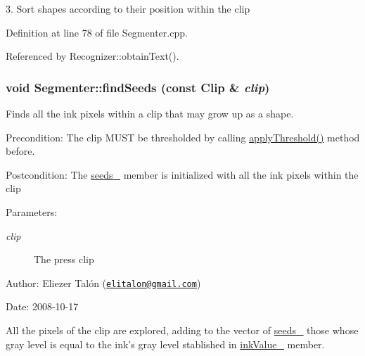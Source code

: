 3. Sort shapes according to their position within the clip 

Definition at line 78 of file Segmenter.cpp.

Referenced by Recognizer::obtainText().\hypertarget{class_segmenter_bacab187b543a51c5322c01fc0a29ffb}{
\subsubsection[findSeeds]{\setlength{\rightskip}{0pt plus 5cm}void Segmenter::findSeeds (const {\bf Clip} \& {\em clip})}}
\label{class_segmenter_bacab187b543a51c5322c01fc0a29ffb}


Finds all the ink pixels within a clip that may grow up as a shape. 

\begin{Desc}
\item[Precondition:]The clip MUST be thresholded by calling \hyperlink{class_segmenter_6854315e3320f9d9a8ece14cbb8570ee}{applyThreshold()} method before.\end{Desc}
\begin{Desc}
\item[Postcondition:]The \hyperlink{class_segmenter_48b7c2c842b26bebda9d0fc13cf81e58}{seeds\_\-} member is initialized with all the ink pixels within the clip\end{Desc}
\begin{Desc}
\item[Parameters:]
\begin{description}
\item[{\em clip}]The press clip\end{description}
\end{Desc}
\begin{Desc}
\item[Author:]Eliezer Talón (\href{mailto:elitalon@gmail.com}{\tt elitalon@gmail.com}) \end{Desc}
\begin{Desc}
\item[Date:]2008-10-17\end{Desc}
All the pixels of the clip are explored, adding to the vector of \hyperlink{class_segmenter_48b7c2c842b26bebda9d0fc13cf81e58}{seeds\_\-} those whose gray level is equal to the ink's gray level stablished in \hyperlink{class_segmenter_fa6183f99aa6011399783652b341a43b}{inkValue\_\-} member. 


